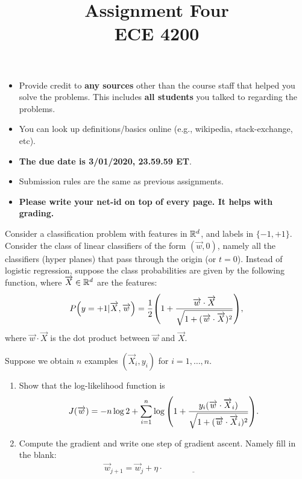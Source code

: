 \documentclass[11pt]{article}
\title{Assignment Four\\ ECE 4200}
\date{}
\newenvironment{problem}[2][Problem]{\begin{trivlist}
\item[\hskip \labelsep {\bfseries #1}\hskip \labelsep {\bfseries #2.}]}{\end{trivlist}}
\begin{document}
\maketitle 

\begin{itemize}
\item
Provide credit to \textbf{any sources} other than the course staff that helped you solve the problems. This includes \textbf{all students} you talked to regarding the problems. 	
\item
You can look up definitions/basics online (e.g., wikipedia, stack-exchange, etc).
\item
{\bf The due date is 3/01/2020, 23.59.59 ET}. 
\item
Submission rules are the same as previous assignments.
\item
\textbf{Please write your net-id on top of every page. It helps with grading.}
\end{itemize}



\begin{problem}{1 (10 points) Different class conditional probabilities}
Consider a classification problem with features in $\mathbb{R}^d$, and labels in $\{-1, +1\}$. Consider the class of linear classifiers of the form $(\overrightarrow w, 0)$, namely all the classifiers (hyper planes) that pass through the origin (or $t=0$). Instead of logistic regression, suppose the class probabilities are given by the following function, where $\overrightarrow X\in\mathbb{R}^d$ are the features:
\begin{align}
P{\left({y=+1|\overrightarrow X, \overrightarrow w}\right)} = \frac12{\left({1+\frac{\overrightarrow w\cdot \overrightarrow X}{\sqrt{1+(\overrightarrow w\cdot \overrightarrow X)^2}}}\right)}, 
\end{align}
where $\overrightarrow w\cdot \overrightarrow X$ is the dot product between $\overrightarrow w$ and  $\overrightarrow X$. 

Suppose we obtain $n$ examples $(\overrightarrow X_i, y_i)$ for $i=1,\ldots, n$. 
\begin{enumerate}
\item 
Show that the log-likelihood function is
\begin{align}
J(\overrightarrow w) = -n\log 2 + \sum_{i=1}^{n} \log {\left({1+ \frac{y_i (\overrightarrow w\cdot \overrightarrow X_i)}{\sqrt{1+(\overrightarrow w\cdot \overrightarrow X_i)^2}}}\right)}.
\end{align}
\item
Compute the gradient and write one step of gradient ascent. Namely fill in the blank:
\begin{align}
\overrightarrow w_{j+1} = \overrightarrow w_j + \eta\cdot \underline{\hspace{3cm}}\nonumber
\end{align}
\end{enumerate}
\end{problem}
\end{document}
